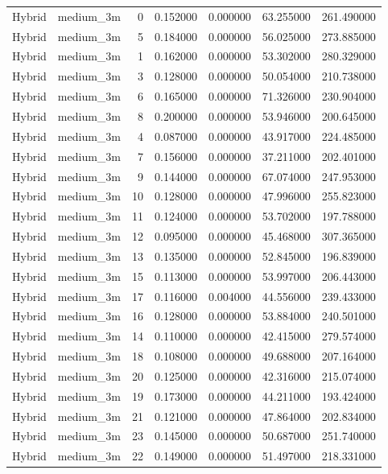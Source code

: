 \begin{tabular}{llrrrrr}
Hybrid & medium_3m & 0 & 0.152000 & 0.000000 & 63.255000 & 261.490000 \\
Hybrid & medium_3m & 5 & 0.184000 & 0.000000 & 56.025000 & 273.885000 \\
Hybrid & medium_3m & 1 & 0.162000 & 0.000000 & 53.302000 & 280.329000 \\
Hybrid & medium_3m & 3 & 0.128000 & 0.000000 & 50.054000 & 210.738000 \\
Hybrid & medium_3m & 6 & 0.165000 & 0.000000 & 71.326000 & 230.904000 \\
Hybrid & medium_3m & 8 & 0.200000 & 0.000000 & 53.946000 & 200.645000 \\
Hybrid & medium_3m & 4 & 0.087000 & 0.000000 & 43.917000 & 224.485000 \\
Hybrid & medium_3m & 7 & 0.156000 & 0.000000 & 37.211000 & 202.401000 \\
Hybrid & medium_3m & 9 & 0.144000 & 0.000000 & 67.074000 & 247.953000 \\
Hybrid & medium_3m & 10 & 0.128000 & 0.000000 & 47.996000 & 255.823000 \\
Hybrid & medium_3m & 11 & 0.124000 & 0.000000 & 53.702000 & 197.788000 \\
Hybrid & medium_3m & 12 & 0.095000 & 0.000000 & 45.468000 & 307.365000 \\
Hybrid & medium_3m & 13 & 0.135000 & 0.000000 & 52.845000 & 196.839000 \\
Hybrid & medium_3m & 15 & 0.113000 & 0.000000 & 53.997000 & 206.443000 \\
Hybrid & medium_3m & 17 & 0.116000 & 0.004000 & 44.556000 & 239.433000 \\
Hybrid & medium_3m & 16 & 0.128000 & 0.000000 & 53.884000 & 240.501000 \\
Hybrid & medium_3m & 14 & 0.110000 & 0.000000 & 42.415000 & 279.574000 \\
Hybrid & medium_3m & 18 & 0.108000 & 0.000000 & 49.688000 & 207.164000 \\
Hybrid & medium_3m & 20 & 0.125000 & 0.000000 & 42.316000 & 215.074000 \\
Hybrid & medium_3m & 19 & 0.173000 & 0.000000 & 44.211000 & 193.424000 \\
Hybrid & medium_3m & 21 & 0.121000 & 0.000000 & 47.864000 & 202.834000 \\
Hybrid & medium_3m & 23 & 0.145000 & 0.000000 & 50.687000 & 251.740000 \\
Hybrid & medium_3m & 22 & 0.149000 & 0.000000 & 51.497000 & 218.331000 \\

\end{tabular}
